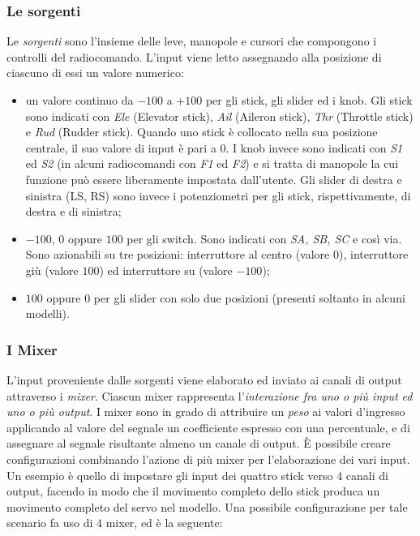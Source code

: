 \documentclass[a4paper, 12pt]{report}
\begin{document}
\subsubsection{Le sorgenti}
Le \emph{sorgenti} sono l'insieme delle leve, manopole e cursori che compongono i controlli del radiocomando. L'input viene letto assegnando alla posizione di ciascuno di essi un valore numerico:
\begin{itemize}
        \item un valore continuo da $-100$ a $+100$ per gli stick, gli slider ed i knob. Gli stick sono indicati con \emph{Ele} (Elevator stick), \emph{Ail} (Aileron stick), \emph{Thr} (Throttle stick) e \emph{Rud} (Rudder stick). Quando uno stick è collocato nella sua posizione centrale, il suo valore di input è pari a $0$. I knob invece sono indicati con \emph{S1} ed \emph{S2} (in alcuni radiocomandi con \emph{F1} ed \emph{F2}) e si tratta di manopole la cui funzione può essere liberamente impostata dall'utente. Gli slider di destra e sinistra (LS, RS) sono invece i potenziometri per gli stick, rispettivamente, di destra e di sinistra;
        \item $-100$, $0$ oppure $100$ per gli switch. Sono indicati con \emph{SA, SB, SC} e così via. Sono azionabili su tre posizioni: interruttore al centro (valore $0$), interruttore giù (valore $100$) ed interruttore su (valore $-100$);

        \item $100$ oppure $0$ per gli slider con solo due posizioni (presenti soltanto in alcuni modelli).
\end{itemize}

\subsubsection{I Mixer}
L'input proveniente dalle sorgenti viene elaborato ed inviato ai canali di output attraverso i \emph{mixer}. Ciascun mixer rappresenta l'\emph{interazione fra uno o più input ed uno o più output}. I mixer sono in grado di attribuire un \emph{peso} ai valori d'ingresso applicando al valore del segnale un coefficiente espresso con una percentuale, e di assegnare al segnale risultante almeno un canale di output. È possibile creare configurazioni combinando l'azione di più mixer per l'elaborazione dei vari input.
Un esempio è quello di impostare gli input dei quattro stick verso 4 canali di output, facendo in modo che il movimento completo dello stick produca un movimento completo del servo nel modello. Una possibile configurazione per tale scenario fa uso di $4$ mixer, ed è la seguente:
\end{document}
